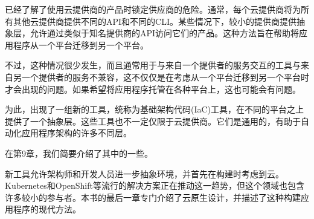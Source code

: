 已经了解了使用云提供商的产品时锁定供应商的危险。通常，每个云提供商将为所有其他云提供商提供不同的API和不同的CLI。某些情况下，较小的提供商提供抽象层，允许通过类似于知名提供商的API访问它们的产品。这种方法旨在帮助将应用程序从一个平台迁移到另一个平台。

不过，这种情况很少发生，而且通常用于与来自一个提供者的服务交互的工具与来自另一个提供者的服务不兼容，这不仅仅是在考虑从一个平台迁移到另一个平台时才会出现的问题。如果希望将应用程序托管在各种平台上，这也可能会有问题。

为此，出现了一组新的工具，统称为基础架构代码(IaC)工具，在不同的平台之上提供了一个抽象层。这些工具也不一定仅限于云提供商。它们是通用的，有助于自动化应用程序架构的许多不同层。

在第9章，我们简要介绍了其中的一些。


新工具允许架构师和开发人员进一步抽象环境，并首先在构建时考虑到云。Kubernetes和OpenShift等流行的解决方案正在推动这一趋势，但这个领域也包含许多较小的参与者。本书的最后一章专门介绍了云原生设计，并描述了这种构建应用程序的现代方法。





